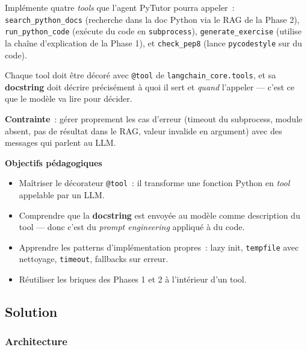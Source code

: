 \documentclass[11pt,a4paper]{article}
\begin{document}
\begin{tcolorbox}[title=Exercice 1. Quatre outils pour l'agent PyTutor]
Implémente quatre \emph{tools} que l'agent PyTutor pourra appeler~:
\texttt{search\_python\_docs} (recherche dans la doc Python via le RAG
de la Phase 2), \texttt{run\_python\_code} (exécute du code en
\texttt{subprocess}), \texttt{generate\_exercise} (utilise la chaîne
d'explication de la Phase 1), et \texttt{check\_pep8} (lance
\texttt{pycodestyle} sur du code).

Chaque tool doit être décoré avec \texttt{@tool} de
\texttt{langchain\_core.tools}, et sa \textbf{docstring} doit décrire
précisément à quoi il sert et \emph{quand} l'appeler — c'est ce que le
modèle va lire pour décider.

\textbf{Contrainte}~: gérer proprement les cas d'erreur (timeout du
subprocess, module absent, pas de résultat dans le RAG, valeur invalide
en argument) avec des messages qui parlent au LLM.

\bigskip
\noindent\textbf{Objectifs pédagogiques}
\begin{itemize}[leftmargin=*]
  \item Maîtriser le décorateur \texttt{@tool}~: il transforme une
        fonction Python en \emph{tool} appelable par un LLM.
  \item Comprendre que la \textbf{docstring} est envoyée au modèle comme
        description du tool — donc c'est du \emph{prompt engineering}
        appliqué à du code.
  \item Apprendre les patterns d'implémentation propres~: lazy init,
        \texttt{tempfile} avec nettoyage, \texttt{timeout}, fallbacks
        sur erreur.
  \item Réutiliser les briques des Phases 1 et 2 à l'intérieur d'un tool.
\end{itemize}
\end{tcolorbox}

\subsection{Solution}

\subsubsection{Architecture}
\end{document}
